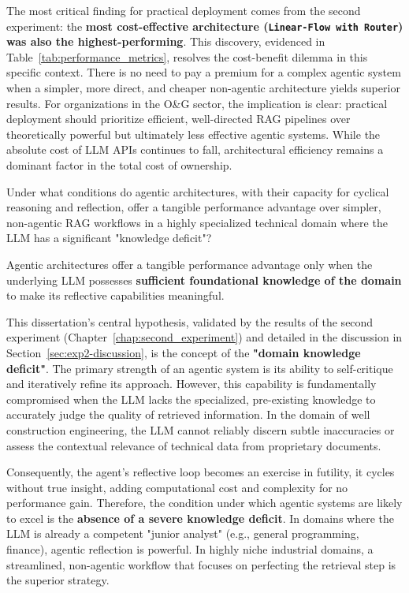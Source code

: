     The most critical finding for practical deployment comes from the second experiment: the \textbf{most cost-effective architecture (\texttt{Linear-Flow with Router}) was also the highest-performing}. This discovery, evidenced in Table~\ref{tab:performance_metrics}, resolves the cost-benefit dilemma in this specific context. There is no need to pay a premium for a complex agentic system when a simpler, more direct, and cheaper non-agentic architecture yields superior results. For organizations in the O\&G sector, the implication is clear: practical deployment should prioritize efficient, well-directed RAG pipelines over theoretically powerful but ultimately less effective agentic systems. While the absolute cost of LLM APIs continues to fall, architectural efficiency remains a dominant factor in the total cost of ownership.

    \vspace{\baselineskip}
    \begin{tcolorbox}[colback=gray!10, colframe=gray!40, title=\textbf{RQ3: Agentic Systems and Domain Specificity}]
    Under what conditions do agentic architectures, with their capacity for cyclical reasoning and reflection, offer a tangible performance advantage over simpler, non-agentic RAG workflows in a highly specialized technical domain where the LLM has a significant "knowledge deficit"?
    \end{tcolorbox}
    \vspace{\baselineskip}

    Agentic architectures offer a tangible performance advantage only when the underlying LLM possesses \textbf{sufficient foundational knowledge of the domain} to make its reflective capabilities meaningful.

    This dissertation's central hypothesis, validated by the results of the second experiment (Chapter~\ref{chap:second_experiment}) and detailed in the discussion in Section~\ref{sec:exp2-discussion}, is the concept of the \textbf{"domain knowledge deficit"}. The primary strength of an agentic system is its ability to self-critique and iteratively refine its approach. However, this capability is fundamentally compromised when the LLM lacks the specialized, pre-existing knowledge to accurately judge the quality of retrieved information. In the domain of well construction engineering, the LLM cannot reliably discern subtle inaccuracies or assess the contextual relevance of technical data from proprietary documents.

    Consequently, the agent's reflective loop becomes an exercise in futility, it cycles without true insight, adding computational cost and complexity for no performance gain. Therefore, the condition under which agentic systems are likely to excel is the \textbf{absence of a severe knowledge deficit}. In domains where the LLM is already a competent "junior analyst" (e.g., general programming, finance), agentic reflection is powerful. In highly niche industrial domains, a streamlined, non-agentic workflow that focuses on perfecting the retrieval step is the superior strategy.

